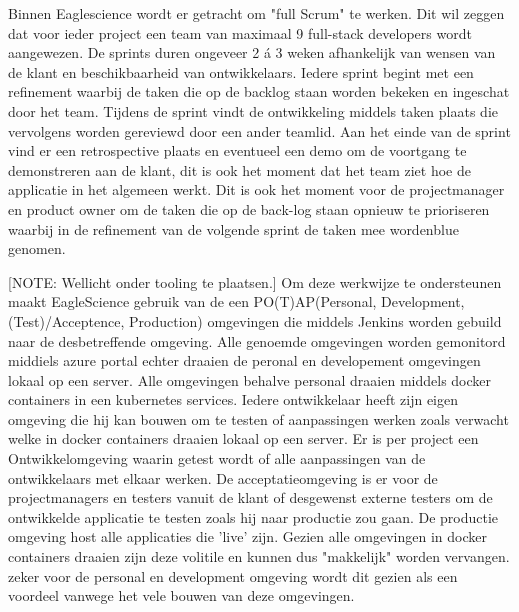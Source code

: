 Binnen Eaglescience wordt er getracht om "full Scrum" te werken. Dit wil zeggen dat voor ieder project een team van maximaal 9 full-stack developers wordt aangewezen. De sprints duren ongeveer 2 á 3 weken afhankelijk van wensen van de klant en beschikbaarheid van ontwikkelaars. Iedere sprint begint met een refinement waarbij de taken die op de backlog staan worden bekeken en ingeschat door het team. Tijdens de sprint vindt de ontwikkeling middels taken plaats die vervolgens worden gereviewd door een ander teamlid. Aan het einde van de sprint vind er een retrospective plaats en eventueel een demo om de voortgang te demonstreren aan de klant, dit is ook het moment dat het team ziet hoe de applicatie in het algemeen werkt. Dit is ook het moment voor de projectmanager en product owner om de taken die op de back-log staan opnieuw te prioriseren waarbij in de refinement van de volgende sprint de taken mee wordenblue genomen.

[NOTE: Wellicht onder tooling te plaatsen.]
Om deze werkwijze te ondersteunen maakt EagleScience gebruik van de een PO(T)AP(Personal, Development, (Test)/Acceptence, Production) omgevingen die middels Jenkins worden gebuild naar de desbetreffende omgeving. Alle genoemde omgevingen worden gemonitord middiels azure portal echter draaien de peronal en developement omgevingen lokaal op een server. Alle omgevingen behalve personal draaien middels docker containers in een kubernetes services. Iedere ontwikkelaar heeft zijn eigen omgeving die hij kan bouwen om te testen of aanpassingen werken zoals verwacht welke in docker containers draaien lokaal op een server. Er is per project een Ontwikkelomgeving waarin getest wordt of alle aanpassingen van de ontwikkelaars met elkaar werken. De acceptatieomgeving is er voor de projectmanagers en testers vanuit de klant of desgewenst externe testers om de ontwikkelde applicatie te testen zoals hij naar productie zou gaan. De productie omgeving host alle applicaties die 'live' zijn. Gezien alle omgevingen in docker containers draaien zijn deze volitile en kunnen dus "makkelijk" worden vervangen. zeker voor de personal en development omgeving wordt dit gezien als een voordeel vanwege het vele bouwen van deze omgevingen.

